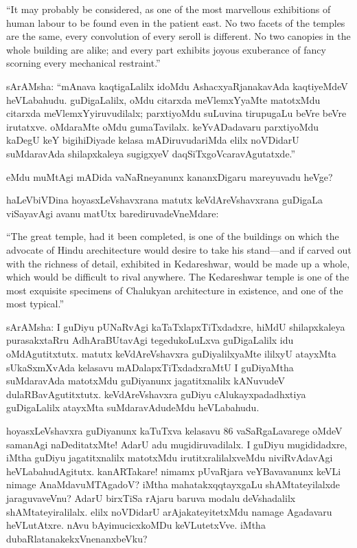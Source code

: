 \documentclass[11pt,a4size]{article}
\begin{document}
{
\rm
``It may probably be considered, as one of the most marvellous
exhibitions of human labour to be found even in the patient east. No
two facets of the temples are the same, every convolution of every
seroll is different. No two canopies in the whole building are alike;
and every part exhibits joyous exuberance of fancy scorning every
mechanical restraint.''}

sArAMsha: ``mAnava kaqtigaLalilx idoMdu AshacxyaRjanakavAda
kaqtiyeMdeV heVLabahudu. guDigaLalilx, oMdu citarxda meVlemxYyaMte
matotxMdu citarxda meVlemxYyiruvudilalx; parxtiyoMdu suLuvina
tirupugaLu beVre beVre irutatxve. oMdaraMte oMdu
gumaTavilalx. keYvADadavaru parxtiyoMdu kaDegU keY bigihiDiyade kelasa
mADiruvudariMda elilx noVDidarU suMdaravAda shilapxkaleya sugigxyeV
daqSiTxgoVcaravAgutatxde.''

eMdu muMtAgi mADida vaNaRneyanunx kananxDigaru mareyuvadu heVge?

haLeVbiVDina hoyasxLeVshavxrana matutx keVdAreVshavxrana guDigaLa
viSayavAgi avanu matUtx barediruvadeVneMdare:

{
\rm
``The great temple, had it been completed, is one of the buildings on
which the advocate of Hindu arechitecture would desire to take his
stand---and if carved out with the richness of detail, exhibited in
Kedareshwar, would be made up a whole, which would be difficult to
rival anywhere. The Kedareshwar temple is one of the most exquisite
specimens of Chalukyan architecture in existence, and one of the most
typical.''}

sArAMsha: I guDiyu pUNaRvAgi kaTaTxlapxTiTxdadxre, hiMdU shilapxkaleya
purasakxtaRru AdhAraBUtavAgi tegedukoLuLxva guDigaLalilx idu
oMdAgutitxtutx. matutx keVdAreVshavxra guDiyalilxyaMte ililxyU
atayxMta sUkaSxmXvAda kelasavu mADalapxTiTxdadxraMtU I guDiyaMtha
suMdaravAda matotxMdu guDiyanunx jagatitxnalilx kANuvudeV
dulaRBavAgutitxtutx. keVdAreVshavxra guDiyu cAlukayxpadadhxtiya
guDigaLalilx atayxMta suMdaravAdudeMdu heVLabahudu.

hoyasxLeVshavxra guDiyanunx kaTuTxva kelasavu 86 vaSaRgaLavarege oMdeV
samanAgi naDeditatxMte! AdarU adu mugidiruvadilalx. I guDiyu
mugididadxre, iMtha guDiyu jagatitxnalilx matotxMdu
irutitxralilalxveMdu niviRvAdavAgi heVLabahudAgitutx. kanARTakare!
nimamx pUvaRjara veYBavavanunx keVLi nimage AnaMdavuMTAgadoV? iMtha
mahatakxqqtayxgaLu shAMtateyilalxde jaraguvaveVnu? AdarU birxTiSa
rAjaru baruva modalu deVshadalilx shAMtateyiralilalx. elilx noVDidarU
arAjakateyitetxMdu namage Agadavaru heVLutAtxre. nAvu bAyimucicxkoMDu
keVLutetxVve. iMtha dubaRlatanakekxVnenanxbeVku?
\end{document}
